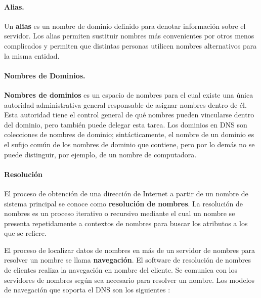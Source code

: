 \paragraph{Alias.}
Un \textbf{alias} es un nombre de dominio definido para denotar información sobre el servidor. Los alias permiten sustituir nombres más convenientes por otros menos complicados y permiten que distintas personas utilicen nombres alternativos para la misma entidad.

\paragraph{Nombres de Dominios.}\textbf{Nombres de dominios} es un espacio de nombres para el cual existe una única autoridad administrativa general responsable de asignar nombres dentro de él. Esta autoridad tiene el control general de qué nombres pueden vincularse dentro del dominio, pero también puede delegar esta tarea. Los dominios en DNS son colecciones de nombres de dominio; sintácticamente, el nombre de un dominio es el sufijo común de los nombres de dominio que contiene, pero por lo demás no se puede distinguir, por ejemplo, de un nombre de computadora.
 

\paragraph{Resolución} 
El proceso de obtención de una dirección de Internet a partir de un nombre de sistema principal se conoce como \textbf{resolución de nombres}.  La resolución de nombres es un proceso iterativo o recursivo mediante el cual un nombre se presenta repetidamente a contextos de nombres para buscar los atributos a los que se refiere. 

El proceso de localizar datos de nombres en más de un servidor de nombres para resolver un nombre se llama \textbf{navegación}. El software de resolución de nombres de clientes realiza la navegación en nombre del cliente. Se comunica con los servidores de nombres según sea necesario para resolver un nombre.  
Los modelos de navegación que soporta el DNS son los siguientes :


